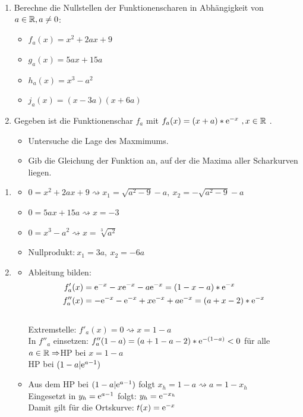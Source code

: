 \begin{enumerate}
  \item Berechne die Nullstellen der Funktionenscharen in Abhängigkeit von $a\in \mathbb{R}, a\neq 0$:
  \begin{itemize}
    \item $f_a(x)=x^2+2ax+9$
    \item $g_a(x)=5ax+15a$
    \item $h_a(x)=x^3-a^2$
    \item $j_a(x)=(x-3a)(x+6a)$
  \end{itemize}
  \item Gegeben ist die Funktionenschar $f_a$ mit $f_a(x)=(x+a)*\mathrm{e}^{-x}\ , x\in \mathbb{R}$ .
  \begin{itemize}
    \item Untersuche die Lage des Maxmimums.
    \item Gib die Gleichung der Funktion an, auf der die Maxima aller Scharkurven liegen.
  \end{itemize}
\end{enumerate}
\begin{lsg}{}
	\begin{enumerate}
		\item \begin{itemize}
			\item $0=x^2+2ax+9 \rightsquigarrow x_1=\sqrt{a^2-9}-a,\ x_2=-\sqrt{a^2-9}-a$\\
			\item $0=5ax+15a \rightsquigarrow x=-3$\\
			\item $0=x^3-a^2 \rightsquigarrow x=\sqrt[3]{a^2}$\\
			\item $\text{Nullprodukt:}\ x_1=3a,\ x_2=-6a$
		\end{itemize}
		\item \begin{itemize}
			\item Ableitung bilden: \begin{align*}
				f'_a(x)&=\mathrm{e}^{-x}-x\mathrm{e}^{-x}-a\mathrm{e}^{-x}=(1-x-a)*\mathrm{e}^{-x}\\
				f''_a(x)&=-\mathrm{e}^{-x}-\mathrm{e}^{-x}+x\mathrm{e}^{-x}+a\mathrm{e}^{-x}=(a+x-2)*\mathrm{e}^{-x}
			\end{align*}\\
			Extremstelle: $f'_a(x)=0 \rightsquigarrow x=1-a$ \\
			In $f''_a$ einsetzen: $f''_a(1-a)=(a+1-a-2)*\mathrm{e}^{-(1-a)}<0$ für alle $a\in \mathbb{R}\Rightarrow $HP bei $x=1-a$\\
			HP bei $(1-a|\mathrm{e}^{a-1})$
			\item Aus dem HP bei $(1-a|\mathrm{e}^{a-1})$ folgt $x_{h}=1-a \rightsquigarrow a=1-x_{h}$\\
			Eingesetzt in $y_{h}=\mathrm{e}^{a-1}$ folgt: $y_h=\mathrm{e}^{-x_h}$ \\
			Damit gilt für die Ortskurve: $t(x)=\mathrm{e}^{-x}$

		\end{itemize}

	\end{enumerate}
\end{lsg}


